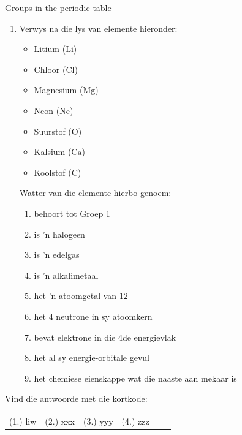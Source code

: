 \begin{exercises}{Groups in the periodic table}
\begin{enumerate}[noitemsep, label=\textbf{\arabic*}. ]
\item            \label{m38760*id262476}Verwys na die lys van elemente hieronder: \label{m38760*id7632}\begin{itemize}[noitemsep]
            \item Litium ($\mathrm{Li}$)\item Chloor ($\mathrm{Cl}$)\item Magnesium ($\mathrm{Mg}$)\item Neon ($\mathrm{Ne}$)\item Suurstof ($\mathrm{O}$)\item Kalsium ($\mathrm{Ca}$)\item Koolstof ($\mathrm{C}$)\end{itemize}
        Watter van die elemente hierbo genoem:
        \label{m38760*id262499}\begin{enumerate}[noitemsep, label=\textbf{\alph*}. ] 
            \label{m38760*uid158}\item behoort tot Groep 1
\label{m38760*uid159}\item is 'n halogeen
\label{m38760*uid160}\item is 'n edelgas
\label{m38760*uid161}\item is 'n alkalimetaal
\label{m38760*uid162}\item het 'n atoomgetal van 12
\label{m38760*uid163}\item het 4 neutrone in sy atoomkern
\label{m38760*uid164}\item bevat elektrone in die 4de energievlak
\label{m38760*uid166}\item het al sy energie-orbitale gevul
\label{m38760*uid167}\item het chemiese eienskappe wat die naaste aan mekaar is
\end{enumerate}
\end{enumerate}
         \par 
\label{m38760**end}
\par {} Vind die antwoorde met die kortkode:
 \par \begin{tabular}[h]{cccccc}
 (1.) liw  & (2.) xxx & (3.) yyy & (4.) zzz \end{tabular}

\end{exercises}
        \par 
